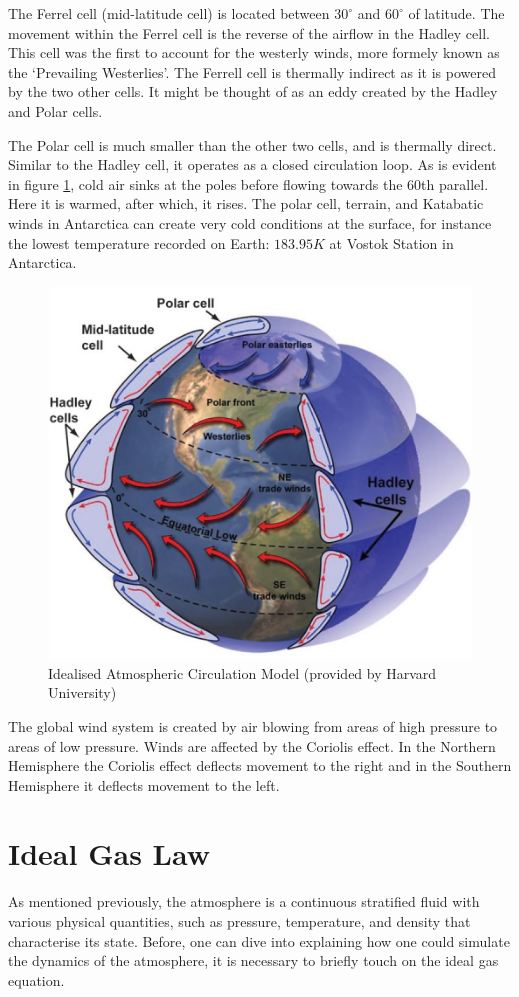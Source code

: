 The Ferrel cell (mid-latitude cell) is located between $30^{\circ}$ and $60^{\circ}$ of latitude. The movement within the Ferrel cell is the reverse of the airflow in the Hadley cell. This cell was the first to account for the westerly winds, more formely known as the `Prevailing Westerlies'. The Ferrell cell is thermally indirect as it is powered by the two other cells. It might be thought of as an eddy created by the Hadley and Polar cells\cite{ferrel}.

The Polar cell is much smaller than the other two cells, and is thermally direct. Similar to the Hadley cell, it operates as a closed circulation loop. As is evident in figure \ref{global_circulation}, cold air sinks at the poles before flowing towards the 60th parallel. Here it is warmed, after which, it rises\cite{cells}. The polar cell, terrain, and Katabatic winds in Antarctica can create very cold conditions at the surface, for instance the lowest temperature recorded on Earth: $183.95 K$ at Vostok Station in Antarctica\cite{polar}.

\begin{figure}[H]
    \centering
    \includegraphics[width=.5\linewidth]{Images/three_cell_globe.png}
    \caption{Idealised Atmospheric Circulation Model (provided by Harvard University)}
    \label{global_circulation}
\end{figure}

The global wind system is created by air blowing from areas of high pressure to areas of low pressure. Winds are affected by the Coriolis effect. In the Northern Hemisphere the Coriolis effect deflects movement to the right and in the Southern Hemisphere it deflects movement to the left.

\section{Ideal Gas Law}\label{ideal}
As mentioned previously, the atmosphere is a continuous stratified fluid with various physical quantities, such as pressure, temperature, and density that characterise its state. Before, one can dive into explaining how one could simulate the dynamics of the atmosphere, it is necessary to briefly touch on the ideal gas equation.

